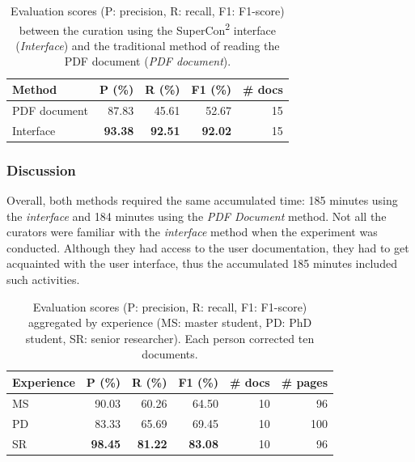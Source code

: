\begin{table}[htpb]
\centering\small
\caption{Evaluation scores (P: precision, R: recall, F1: F1-score) between the curation using the SuperCon\textsuperscript{2} interface (\textit{Interface}) and the traditional method of reading the PDF document (\textit{PDF document}). }
\begin{tabular}{lrrrr}
\toprule
    \textbf{Method}    & \textbf{P (\%)}   & \textbf{R (\%)}   & \textbf{F1 (\%)}  & \textbf{\# docs}   \\
    \midrule
    PDF document    & 87.83             & 45.61             & 52.67             & 15        \\
    Interface       & \textbf{93.38}    & \textbf{92.51}    & \textbf{92.02}    & 15        \\
    \bottomrule
\end{tabular}
\label{tab:evaluation-interface-correction}
\end{table}


\subsubsection{Discussion}
Overall, both methods required the same accumulated time: 185 minutes using the \textit{interface} and 184 minutes using the \textit{PDF Document} method.
Not all the curators were familiar with the \textit{interface} method when the experiment was conducted. Although they had access to the user documentation, they had to get acquainted with the user interface, thus the accumulated 185 minutes included such activities. 

\begin{table}[htbp]
\centering
\caption{Evaluation scores (P: precision, R: recall, F1: F1-score) aggregated by experience (MS: master student, PD: PhD student, SR: senior researcher). Each person corrected ten documents.}
\begin{tabular}{lrrrrr}
\toprule
\textbf{Experience} & \textbf{P (\%)}   & \textbf{R (\%)}   & \textbf{F1 (\%)}  & \textbf{\#  docs} & \textbf{\# pages}\\
\midrule
MS      & 90.03             & 60.26             & 64.50           & 10  & 96    \\
PD      & 83.33             & 65.69             & 69.45           & 10  & 100   \\
SR      & \textbf{98.45}    & \textbf{81.22}    & \textbf{83.08}  & 10  & 96  \\
\bottomrule
\end{tabular}
\label{tab:accuracy-by-experience}
\end{table}

